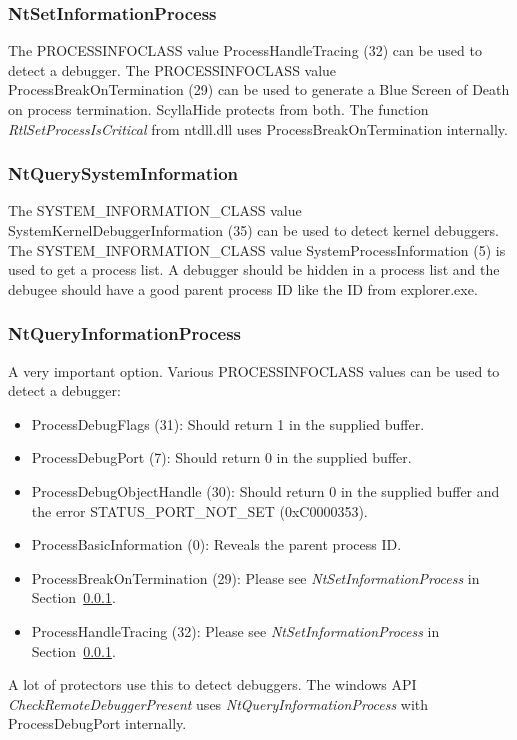 \documentclass[10pt,a4paper]{article}
\begin{document}
\subsubsection{NtSetInformationProcess}
\label{sec:NtSetInformationProcess_section}
The PROCESSINFOCLASS value ProcessHandleTracing (32) can be used to detect a debugger. The PROCESSINFOCLASS value ProcessBreakOnTermination (29) can be used to generate a Blue Screen of Death on process termination. ScyllaHide protects from both. The function \textit{RtlSetProcessIsCritical} from ntdll.dll uses ProcessBreakOnTermination internally.

\subsubsection{NtQuerySystemInformation}
The SYSTEM\_INFORMATION\_CLASS value SystemKernelDebuggerInformation (35) can be used to detect kernel debuggers. The SYSTEM\_INFORMATION\_CLASS value SystemProcessInformation (5) is used to get a process list. A debugger should be hidden in a process list and the debugee should have a good parent process ID like the ID from explorer.exe.

\subsubsection{NtQueryInformationProcess}
A very important option. Various PROCESSINFOCLASS values can be used to detect a debugger:
\begin{itemize}
\item ProcessDebugFlags (31): Should return 1 in the supplied buffer.
\item ProcessDebugPort (7): Should return 0 in the supplied buffer.
\item ProcessDebugObjectHandle (30): Should return 0 in the supplied buffer and the error STATUS\_PORT\_NOT\_SET (0xC0000353).
\item ProcessBasicInformation (0): Reveals the parent process ID.
\item ProcessBreakOnTermination (29): Please see \textit{NtSetInformationProcess} in Section~\ref{sec:NtSetInformationProcess_section}.
\item ProcessHandleTracing (32): Please see \textit{NtSetInformationProcess} in Section~\ref{sec:NtSetInformationProcess_section}.
\end{itemize}
A lot of protectors use this to detect debuggers. The windows API \textit{CheckRemoteDebuggerPresent} uses \textit{NtQueryInformationProcess} with ProcessDebugPort internally.
\end{document}

